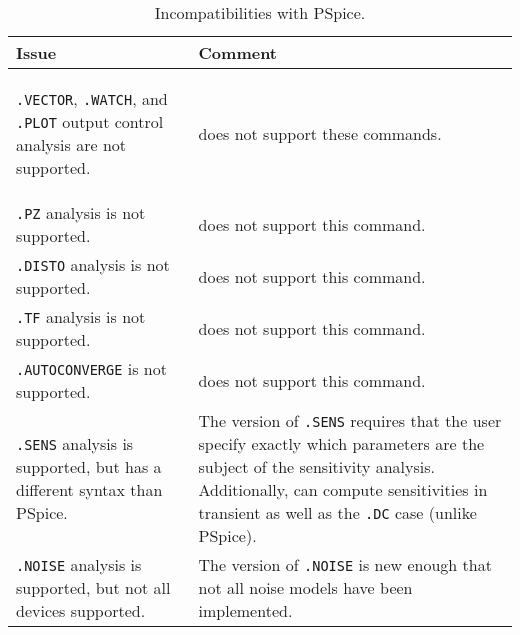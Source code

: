 



\begin{longtable}[h] {>{\raggedright\small}m{2in}|>{\raggedright\let\\\tabularnewline\small}m{4in}}
  \caption{Incompatibilities with PSpice.} \\ \hline
  \rowcolor{XyceDarkBlue}
  \color{white}\bf Issue & 
  \color{white}\bf Comment \\ \hline \endfirsthead
  \label{Incompat_PS}

\texttt{.VECTOR}, \texttt{.WATCH}, and \texttt{.PLOT}  output 
control analysis are not supported. & \Xyce{} does 
not support these commands.  \\ \hline


\texttt{.PZ} analysis is not supported. & \Xyce{} does not support this command.  
\\ \hline


\texttt{.DISTO} analysis is not supported. & \Xyce{} does not support this command.  
\\ \hline

\texttt{.TF} analysis is not supported. & \Xyce{} does not support this command.  
\\ \hline

\texttt{.AUTOCONVERGE} is not supported. & \Xyce{} does not support this command.  
\\ \hline

\texttt{.SENS} analysis is supported, but has a different syntax than PSpice. & The \Xyce{} version of \texttt{.SENS} requires that the user specify exactly which parameters are the subject of the sensitivity analysis.  Additionally, \Xyce{} can compute sensitivities in transient as well as the \texttt{.DC} case (unlike PSpice).
\\ \hline

\texttt{.NOISE} analysis is supported, but not all devices supported. & The \Xyce{} version of \texttt{.NOISE} is new enough that not all noise models have been implemented.
\\ \hline


\end{longtable}
